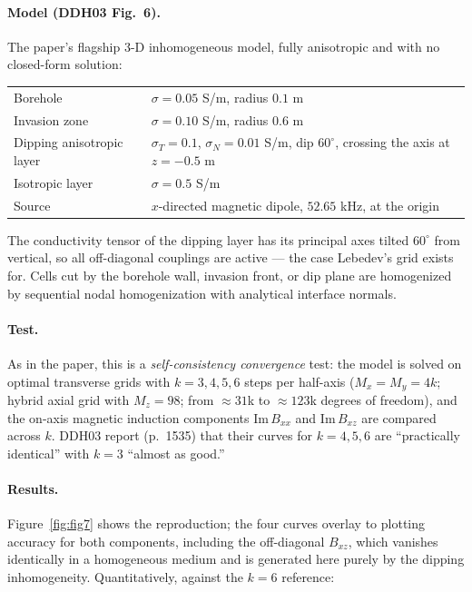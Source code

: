 \documentclass[11pt]{article}
\begin{document}
\paragraph{Model (DDH03 Fig.~6).} The paper's flagship 3-D inhomogeneous
model, fully anisotropic and with no closed-form solution:
\begin{center}
\begin{tabular}{ll}
\toprule
Borehole & $\sigma = 0.05$ S/m, radius $0.1$ m \\
Invasion zone & $\sigma = 0.10$ S/m, radius $0.6$ m \\
Dipping anisotropic layer & $\sigma_T = 0.1$, $\sigma_N = 0.01$ S/m,
dip $60^\circ$, crossing the axis at $z=-0.5$ m \\
Isotropic layer & $\sigma = 0.5$ S/m \\
Source & $x$-directed magnetic dipole, $52.65$ kHz, at the origin \\
\bottomrule
\end{tabular}
\end{center}
The conductivity tensor of the dipping layer has its principal axes tilted
$60^\circ$ from vertical, so all off-diagonal couplings are active --- the
case Lebedev's grid exists for. Cells cut by the borehole wall, invasion
front, or dip plane are homogenized by sequential nodal homogenization with
analytical interface normals.

\paragraph{Test.} As in the paper, this is a \emph{self-consistency
convergence} test: the model is solved on optimal transverse grids with
$k = 3, 4, 5, 6$ steps per half-axis ($M_x = M_y = 4k$; hybrid axial grid
with $M_z = 98$; from $\approx31$k to $\approx123$k degrees of freedom), and
the on-axis magnetic induction components $\mathrm{Im}\,B_{xx}$ and
$\mathrm{Im}\,B_{xz}$ are compared across $k$. DDH03 report (p.~1535) that
their curves for $k = 4, 5, 6$ are ``practically identical'' with $k=3$
``almost as good.''

\paragraph{Results.} Figure~\ref{fig:fig7} shows the reproduction; the four
curves overlay to plotting accuracy for both components, including the
off-diagonal $B_{xz}$, which vanishes identically in a homogeneous medium and
is generated here purely by the dipping inhomogeneity. Quantitatively,
against the $k=6$ reference:
\end{document}
